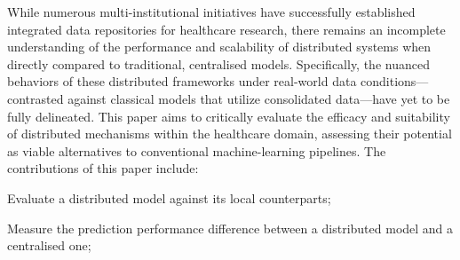 
While numerous multi-institutional initiatives have successfully established integrated data repositories for healthcare research, there remains an incomplete understanding of the performance and scalability of distributed systems when directly compared to traditional, centralised models. Specifically, the nuanced behaviors of these distributed frameworks under real-world data conditions—contrasted against classical models that utilize consolidated data—have yet to be fully delineated. This paper aims to critically evaluate the efficacy and suitability of distributed mechanisms within the healthcare domain, assessing their potential as viable alternatives to conventional machine-learning pipelines. The contributions of this paper include:

\begin{myitemize}
    \item Evaluate a distributed model against its local counterparts;
    \item Measure the prediction performance difference between a distributed model and a centralised one;

\end{myitemize}
